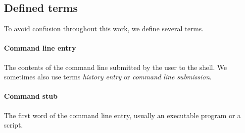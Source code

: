 \documentclass[thesis=M,english]{FITthesis}[2012/10/20]
\begin{document}
\begin{introduction}
\section*{Defined terms}

To avoid confusion throughout this work, we define several terms.

\paragraph{Command line entry} The contents of the command line submitted by the user to the shell. We sometimes also use terms \textit{history entry} or \textit{command line submission}. 

\paragraph{Command stub} The first word of the command line entry, usually an executable program or a script.



\end{introduction}









\end{document}
